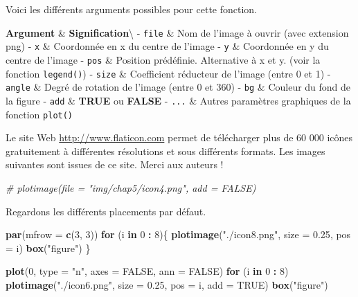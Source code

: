 \documentclass[]{article}
\newenvironment{Shaded}{\begin{snugshade}}{\end{snugshade}}
\newcommand{\CommentTok}[1]{\textcolor[rgb]{0.56,0.35,0.01}{\textit{#1}}}
\newcommand{\ControlFlowTok}[1]{\textcolor[rgb]{0.13,0.29,0.53}{\textbf{#1}}}
\newcommand{\DataTypeTok}[1]{\textcolor[rgb]{0.13,0.29,0.53}{#1}}
\newcommand{\DecValTok}[1]{\textcolor[rgb]{0.00,0.00,0.81}{#1}}
\newcommand{\FloatTok}[1]{\textcolor[rgb]{0.00,0.00,0.81}{#1}}
\newcommand{\KeywordTok}[1]{\textcolor[rgb]{0.13,0.29,0.53}{\textbf{#1}}}
\newcommand{\NormalTok}[1]{#1}
\newcommand{\OperatorTok}[1]{\textcolor[rgb]{0.81,0.36,0.00}{\textbf{#1}}}
\newcommand{\OtherTok}[1]{\textcolor[rgb]{0.56,0.35,0.01}{#1}}
\newcommand{\StringTok}[1]{\textcolor[rgb]{0.31,0.60,0.02}{#1}}
\begin{document}
Voici les différents arguments possibles pour cette fonction.

\textbf{Argument} \& \textbf{Signification}\textbackslash{}
- \texttt{file} \& Nom de l'image à ouvrir (avec extension png)
- \texttt{x} \& Coordonnée en x du centre de l'image
- \texttt{y} \& Coordonnée en y du centre de l'image
- \texttt{pos} \& Position prédéfinie. Alternative à x et y. (voir la fonction \texttt{legend()})
- \texttt{size} \& Coefficient réducteur de l'image (entre 0 et 1)
- \texttt{angle} \& Degré de rotation de l'image (entre 0 et 360)
- \texttt{bg} \& Couleur du fond de la figure
- \texttt{add} \& \textbf{TRUE} ou \textbf{FALSE}
- \texttt{...} \& Autres paramètres graphiques de la fonction \texttt{plot()}

Le site Web \url{http://www.flaticon.com} permet de télécharger plus de 60 000 icônes gratuitement à différentes résolutions et sous différents formats. Les images suivantes sont issues de ce site. Merci aux auteurs !

\begin{Shaded}
\begin{Highlighting}[]
\CommentTok{# plotimage(file = "img/chap5/icon4.png", add = FALSE)}
\end{Highlighting}
\end{Shaded}

Regardons les différents placements par défaut.

\begin{Shaded}
\begin{Highlighting}[]
\KeywordTok{par}\NormalTok{(}\DataTypeTok{mfrow =} \KeywordTok{c}\NormalTok{(}\DecValTok{3}\NormalTok{, }\DecValTok{3}\NormalTok{))}
\ControlFlowTok{for}\NormalTok{ (i }\ControlFlowTok{in} \DecValTok{0} \OperatorTok{:}\StringTok{ }\DecValTok{8}\NormalTok{)\{}
\KeywordTok{plotimage}\NormalTok{(}\StringTok{"./icon8.png"}\NormalTok{, }\DataTypeTok{size =} \FloatTok{0.25}\NormalTok{, }\DataTypeTok{pos =}\NormalTok{ i)}
\KeywordTok{box}\NormalTok{(}\StringTok{"figure"}\NormalTok{)}
\NormalTok{\}}
\end{Highlighting}
\end{Shaded}

\begin{Shaded}
\begin{Highlighting}[]
\KeywordTok{plot}\NormalTok{(}\DecValTok{0}\NormalTok{, }\DataTypeTok{type =} \StringTok{"n"}\NormalTok{, }\DataTypeTok{axes =} \OtherTok{FALSE}\NormalTok{, }\DataTypeTok{ann =} \OtherTok{FALSE}\NormalTok{)}
\ControlFlowTok{for}\NormalTok{ (i }\ControlFlowTok{in} \DecValTok{0} \OperatorTok{:}\StringTok{ }\DecValTok{8}\NormalTok{)}
\KeywordTok{plotimage}\NormalTok{(}\StringTok{"./icon6.png"}\NormalTok{, }\DataTypeTok{size =} \FloatTok{0.25}\NormalTok{, }\DataTypeTok{pos =}\NormalTok{ i, }\DataTypeTok{add =} \OtherTok{TRUE}\NormalTok{)}
\KeywordTok{box}\NormalTok{(}\StringTok{"figure"}\NormalTok{)}
\end{Highlighting}
\end{Shaded}
\end{document}
